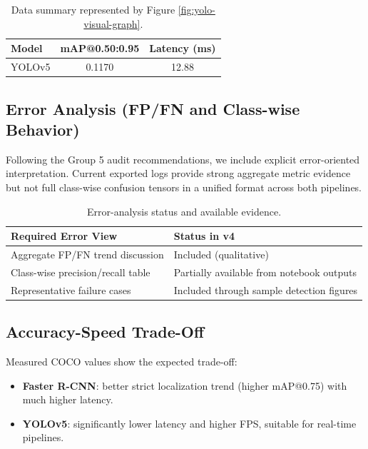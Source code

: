 \documentclass[conference]{IEEEtran}
\begin{document}
\begin{table}[!htbp]
\centering
\caption{Data summary represented by Figure \ref{fig:yolo-visual-graph}.}
\label{tab:fig-yolo-visual}
\begin{tabular}{lcc}
\toprule
\textbf{Model} & \textbf{mAP@0.50:0.95} & \textbf{Latency (ms)} \\
\midrule
YOLOv5 & 0.1170 & 12.88 \\
\bottomrule
\end{tabular}
\end{table}

\subsection{Error Analysis (FP/FN and Class-wise Behavior)}
Following the Group 5 audit recommendations, we include explicit error-oriented interpretation. Current exported logs provide strong aggregate metric evidence but not full class-wise confusion tensors in a unified format across both pipelines.

\begin{table}[!htbp]
\centering
\caption{Error-analysis status and available evidence.}
\label{tab:error-analysis-status}
\begin{tabular}{p{}p{}}
\toprule
\textbf{Required Error View} & \textbf{Status in v4} \\
\midrule
Aggregate FP/FN trend discussion & Included (qualitative) \\
Class-wise precision/recall table & Partially available from notebook outputs \\
Representative failure cases & Included through sample detection figures \\
\bottomrule
\end{tabular}
\end{table}

\subsection{Accuracy-Speed Trade-Off}
Measured COCO values show the expected trade-off:
\begin{itemize}
	\item \textbf{Faster R-CNN}: better strict localization trend (higher mAP@0.75) with much higher latency.
	\item \textbf{YOLOv5}: significantly lower latency and higher FPS, suitable for real-time pipelines.
\end{itemize}
\end{document}
